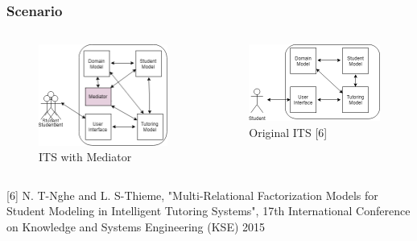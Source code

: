 \documentclass{beamer}
\begin{document}
\begin{frame}
\frametitle{Scenario}
\begin{columns}[onlytextwidth]
	\begin{column}{.45\textwidth}
		\begin{figure}
			\includegraphics[width=.95\textwidth]{pp1}

				\caption{ITS with Mediator}
		\end{figure}
	\end{column}
	\hfill
	\begin{column}{.45\textwidth}
		\begin{figure}
			\includegraphics[width=.95\textwidth]{pp2}
					\caption{Original ITS [6]}

					
		\end{figure}
	
	\end{column}

\end{columns}

\begin{thebibliography}{01}
	 {\tiny 					[6] N. T-Nghe and L. S-Thieme, "Multi-Relational Factorization Models for Student Modeling in Intelligent Tutoring Systems",  17th International Conference on Knowledge and Systems Engineering (KSE) 2015
	}
\end{thebibliography}

\end{frame}
\end{document}
